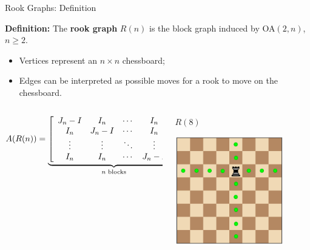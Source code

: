 \documentclass{beamer}
\begin{document}
\begin{frame}{Rook Graphs: Definition}

    \textbf{Definition:} The \textbf{rook graph} \( R(n) \) is the block graph induced by OA$(2,n)$, $n\geq2$. 
  \begin{itemize}
    \item Vertices represent an $n\times n$ chessboard;
    \item Edges can be interpreted as possible moves for a rook to move on the chessboard.
  \end{itemize}

    \vspace{1em}
  \begin{columns}
      \begin{column}{0.7\textwidth}
            \[
            \begin{aligned}
                A(R(n)) = \underbrace{
                \left[
                    \begin{array}{cccc}
                    J_{n} - I & I_n & \cdots & I_n \\
                    I_n & J_n - I & \cdots & I_n \\
                    \vdots & \vdots & \ddots & \vdots \\
                    I_n & I_n & \cdots & J_n - I
                    \end{array}
                \right].
                }_{\text{\( n \) blocks}}
            \end{aligned}
            \]
      \end{column}

      \begin{column}{0.3\textwidth}
        \centering

        $R(8)$
        
        \includegraphics[width=0.8\textwidth]{slides/rook-moves.png}
    \end{column}
  \end{columns}
\end{frame}
\end{document}
